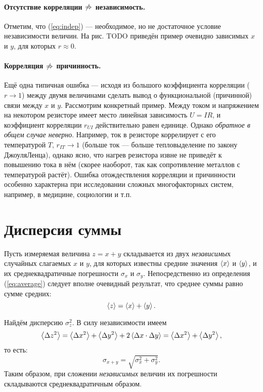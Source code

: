 \paragraph{Отсутствие корреляции $\protect\not\Rightarrow$ независимость.}

Отметим, что (\ref{eq:indep}) --- необходимое,
но не достаточное условие независимости величин. На рис. TODO приведён
пример очевидно зависимых $x$ и $y$, для которых $r\approx0$.

\paragraph{Корреляция $\protect\not\Rightarrow$ причинность.}

Ещё одна типичная ошибка --- исходя из большого
коэффициента корреляции ($r\to1$) между двумя величинами сделать
вывод о функциональной (причинной) связи между $x$ и $y$. Рассмотрим
конкретный пример. Между током и напряжением на некотором резисторе
имеет место линейная зависимость $U=IR$, и коэффициент корреляции
$r_{UI}$ действительно равен единице. Однако \emph{обратное
в общем случае неверно}. Например, ток в резисторе коррелирует
с его температурой $T$, $r_{IT}\to1$ (больше ток --- больше
тепловыделение по закону Джоуля\textendash Ленца), однако ясно, что
нагрев резистора извне не приведёт к повышению тока в нём (скорее
наоборот, так как сопротивление металлов с температурой растёт). Ошибка
отождествления корреляции и причинности особенно характерна при исследовании
сложных многофакторных систем, например, в медицине, социологии и
т.п.

\section{Дисперсия суммы}\label{sec:sum2}

Пусть измеряемая величина $z=x+y$ складывается из двух \emph{независимы}х
случайных слагаемых $x$ и $y$, для которых известны средние значения
$\left<x\right>$ и $\left<y\right>$, и их среднеквадратичные погрешности
$\sigma_{x}$ и $\sigma_{y}$. Непосредственно из определения (\ref{eq:average})
следует вполне очевидный результат, что среднее суммы равно сумме
средних:
\[
\left<z\right>=\left<x\right>+\left<y\right>.
\]

Найдём дисперсию $\sigma_{z}^{2}$. В силу независимости имеем
\[
\left<\Delta z^{2}\right>=\left<\Delta x^{2}\right>+\left<\Delta
y^{2}\right>+2\left<\Delta x\cdot\Delta y\right>=\left<\Delta x^{2}\right>+\left<\Delta
y^{2}\right>,
\]
то есть:
\begin{equation}
\boxed{{\sigma_{x+y}=\sqrt{\sigma_{x}^{2}+\sigma_{y}^{2}}}}.\label{eq:sigma_sum}
\end{equation}
Таким образом, при сложении \emph{независимых }величин их погрешности
складываются среднеквадратичным образом.

